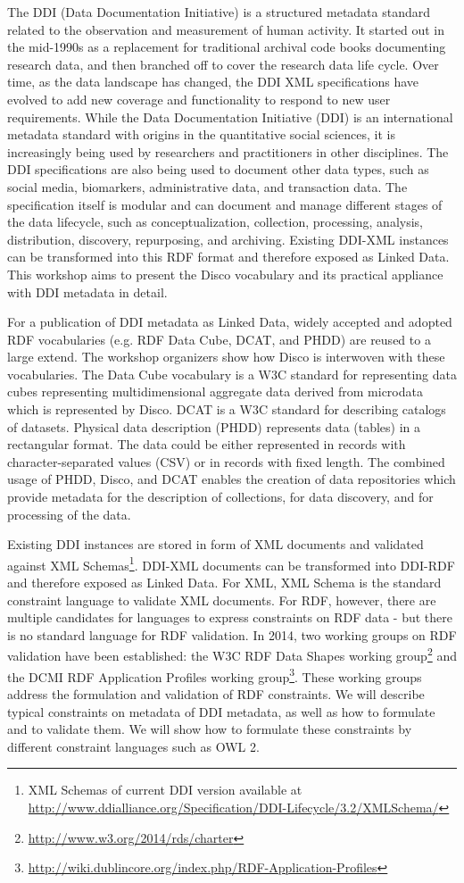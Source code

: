 \documentclass{llncs}
\begin{document}
The DDI (Data Documentation Initiative) is a structured metadata standard related to the observation and measurement of human activity.
It started out in the mid-1990s as a replacement for traditional archival code books documenting research data, and then branched off to cover the research data life cycle. Over time, as the data landscape has
changed, the DDI XML specifications have evolved to add new coverage and functionality to respond to new user requirements.
While the Data Documentation Initiative (DDI) is an international metadata standard with origins in the quantitative social sciences, it is increasingly being used by researchers and practitioners in other disciplines. The DDI specifications are also being used to document other data types, such as social media, biomarkers, administrative data, and transaction data. The specification itself is modular and can document and manage different stages of the data lifecycle, such as conceptualization, collection, processing, analysis, distribution, discovery, repurposing, and archiving.
Existing DDI-XML instances can be transformed into this RDF format and therefore exposed as Linked Data. This workshop aims to present the Disco vocabulary and its practical appliance with DDI metadata in detail.
 
For a publication of DDI metadata as Linked Data, widely accepted and adopted RDF vocabularies (e.g. RDF Data Cube, DCAT, and PHDD) are reused to a large extend. The workshop organizers show how Disco is interwoven with these vocabularies. The Data Cube vocabulary is a W3C standard for representing data cubes representing multidimensional aggregate data derived from microdata which is represented by Disco. DCAT is a W3C standard for describing catalogs of datasets. Physical data description (PHDD) represents data (tables) in a rectangular format. The data could be either represented in records with character-separated values (CSV) or in records with fixed length. The combined usage of PHDD, Disco, and DCAT enables the creation of data repositories which provide metadata for the description of collections, for data discovery, and for processing of the data. 

Existing DDI instances are stored in form of XML documents and validated against XML Schemas\footnote{XML Schemas of current DDI version available at \url{http://www.ddialliance.org/Specification/DDI-Lifecycle/3.2/XMLSchema/}}.
DDI-XML documents can be transformed into DDI-RDF and therefore exposed as Linked Data.
For XML, XML Schema is the standard constraint language to validate XML documents.
For RDF, however, there are multiple candidates for languages to express constraints on RDF data - but there is no standard language for RDF validation.
In 2014, two working groups on RDF validation have been established: the W3C RDF Data Shapes working group\footnote{\url{http://www.w3.org/2014/rds/charter}} and the DCMI RDF Application Profiles working group\footnote{\url{http://wiki.dublincore.org/index.php/RDF-Application-Profiles}}.
These working groups address the formulation and validation of RDF constraints.
We will describe typical constraints on metadata of DDI metadata, as well as how to formulate and to validate them.
We will show how to formulate these constraints by different constraint languages such as OWL 2.
\end{document}
